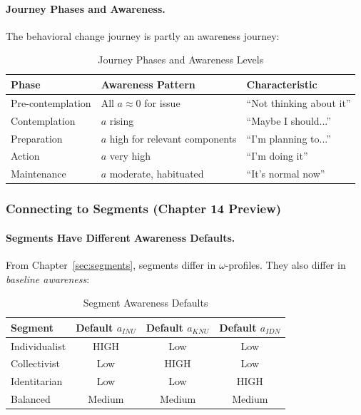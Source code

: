 \paragraph{Journey Phases and Awareness.}
The behavioral change journey is partly an awareness journey:

\begin{table}[htbp]
\centering
\caption{Journey Phases and Awareness Levels}
\label{tab:journey-awareness}
\renewcommand{\arraystretch}{1.3}
\begin{tabular}{@{}lll@{}}
\toprule
\textbf{Phase} & \textbf{Awareness Pattern} & \textbf{Characteristic} \\
\midrule
Pre-contemplation & All $a \approx 0$ for issue & ``Not thinking about it'' \\
Contemplation & $a$ rising & ``Maybe I should...'' \\
Preparation & $a$ high for relevant components & ``I'm planning to...'' \\
Action & $a$ very high & ``I'm doing it'' \\
Maintenance & $a$ moderate, habituated & ``It's normal now'' \\
\bottomrule
\end{tabular}
\end{table}

\subsubsection{Connecting to Segments (Chapter 14 Preview)}

\paragraph{Segments Have Different Awareness Defaults.}
From Chapter~\ref{sec:segments}, segments differ in $\omega$-profiles.
They also differ in \emph{baseline awareness}:

\begin{table}[htbp]
\centering
\caption{Segment Awareness Defaults}
\label{tab:segment-awareness}
\renewcommand{\arraystretch}{1.3}
\begin{tabular}{@{}lccc@{}}
\toprule
\textbf{Segment} & \textbf{Default $a_{INU}$} & \textbf{Default $a_{KNU}$} & \textbf{Default $a_{IDN}$} \\
\midrule
Individualist & HIGH & Low & Low \\
Collectivist & Low & HIGH & Low \\
Identitarian & Low & Low & HIGH \\
Balanced & Medium & Medium & Medium \\
\bottomrule
\end{tabular}
\end{table}

